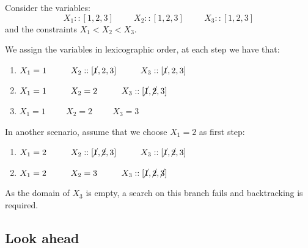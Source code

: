 \begin{example}
    Consider the variables: 
    \[ X_1 :: [1, 2, 3] \hspace{1cm} X_2 :: [1, 2, 3] \hspace{1cm} X_3 :: [1, 2, 3] \]
    and the constraints $X_1 < X_2 < X_3$.

    We assign the variables in lexicographic order, at each step we have that:
    \begin{enumerate}
        \item $X_1 = 1 \hspace{1cm} X_2 :: [\cancel{1}, 2, 3] \hspace{1cm} X_3 :: [\cancel{1}, 2, 3]$
        \item $X_1 = 1 \hspace{1cm} X_2 = 2 \hspace{1cm} X_3 :: [\cancel{1}, \cancel{2}, 3]$
        \item $X_1 = 1 \hspace{1cm} X_2 = 2 \hspace{1cm} X_3 = 3$
    \end{enumerate}

    In another scenario, assume that we choose $X_1 = 2$ as first step:
    \begin{enumerate}
        \item $X_1 = 2 \hspace{1cm} X_2 :: [\cancel{1}, \cancel{2}, 3] \hspace{1cm} X_3 :: [\cancel{1}, \cancel{2}, 3]$
        \item $X_1 = 2 \hspace{1cm} X_2 = 3 \hspace{1cm} X_3 :: [\cancel{1}, \cancel{2}, \cancel{3}]$
    \end{enumerate}
    As the domain of $X_3$ is empty, a search on this branch fails and backtracking is required.
\end{example}



\subsection{Look ahead}

